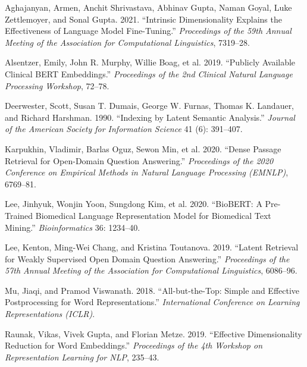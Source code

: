 \documentclass[
  11pt,
  letterpaper,
]{article}
\newlength{\cslhangindent}
\newenvironment{CSLReferences}[2] %
 {\begin{list}{}{%
  \setlength{\itemindent}{0pt}
  \setlength{\leftmargin}{0pt}
  \setlength{\parsep}{0pt}
  \ifodd #1
   \setlength{\leftmargin}{\cslhangindent}
   \setlength{\itemindent}{-1\cslhangindent}
  \fi
  \setlength{\itemsep}{#2\baselineskip}}}
 {\end{list}}
\begin{document}
\protect{}\label{refs}
\begin{CSLReferences}{1}{1}
Aghajanyan, Armen, Anchit Shrivastava, Abhinav Gupta, Naman Goyal, Luke
Zettlemoyer, and Sonal Gupta. 2021. {``Intrinsic Dimensionality Explains
the Effectiveness of Language Model Fine-Tuning.''} \emph{Proceedings of
the 59th Annual Meeting of the Association for Computational
Linguistics}, 7319--28.

Alsentzer, Emily, John R. Murphy, Willie Boag, et al. 2019. {``Publicly
Available Clinical BERT Embeddings.''} \emph{Proceedings of the 2nd
Clinical Natural Language Processing Workshop}, 72--78.

Deerwester, Scott, Susan T. Dumais, George W. Furnas, Thomas K.
Landauer, and Richard Harshman. 1990. {``Indexing by Latent Semantic
Analysis.''} \emph{Journal of the American Society for Information
Science} 41 (6): 391--407.

Karpukhin, Vladimir, Barlas Oguz, Sewon Min, et al. 2020. {``Dense
Passage Retrieval for Open-Domain Question Answering.''}
\emph{Proceedings of the 2020 Conference on Empirical Methods in Natural
Language Processing (EMNLP)}, 6769--81.

Lee, Jinhyuk, Wonjin Yoon, Sungdong Kim, et al. 2020. {``BioBERT: A
Pre-Trained Biomedical Language Representation Model for Biomedical Text
Mining.''} \emph{Bioinformatics} 36: 1234--40.

Lee, Kenton, Ming-Wei Chang, and Kristina Toutanova. 2019. {``Latent
Retrieval for Weakly Supervised Open Domain Question Answering.''}
\emph{Proceedings of the 57th Annual Meeting of the Association for
Computational Linguistics}, 6086--96.

Mu, Jiaqi, and Pramod Viswanath. 2018. {``All-but-the-Top: Simple and
Effective Postprocessing for Word Representations.''}
\emph{International Conference on Learning Representations (ICLR)}.

Raunak, Vikas, Vivek Gupta, and Florian Metze. 2019. {``Effective
Dimensionality Reduction for Word Embeddings.''} \emph{Proceedings of
the 4th Workshop on Representation Learning for NLP}, 235--43.


\end{CSLReferences}
\end{document}
